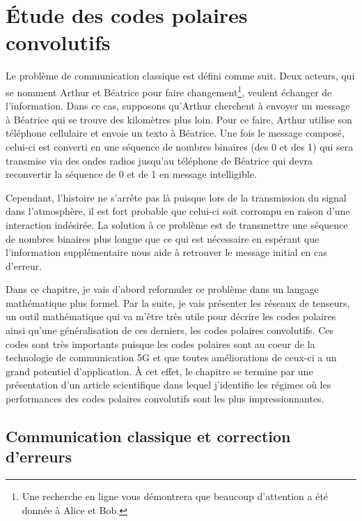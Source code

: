 \begin{comment}
\end{comment}

\chapter{Étude des codes polaires convolutifs}

Le problème de communication classique est défini comme suit.
Deux acteurs, 
qui se nomment Arthur et Béatrice pour faire changement\footnote{
  Une recherche en ligne vous démontrera que beaucoup d'attention a été donnée 
  à Alice et Bob. 
},
veulent échanger de l'information.
Dans ce cas,
supposons qu'Arthur cherchent à envoyer un message à Béatrice qui se trouve
des kilomètres plus loin.
Pour ce faire,
Arthur utilise son téléphone cellulaire et envoie un texto à Béatrice.
Une fois le message composé,
celui-ci est converti en une séquence de nombres binaires (des 0 et des 1)
qui sera transmise via des ondes radios jusqu'au téléphone de Béatrice
qui devra reconvertir la séquence de 0 et de 1 en message intelligible.

Cependant, 
l'histoire ne s'arrête pas là puisque lors de la transmission du signal
dans l'atmosphère, il est fort probable que celui-ci soit corrompu en 
raison d'une interaction indésirée.
La solution à ce problème est de transmettre une séquence de nombres binaires
plus longue que ce qui est nécessaire en espérant que l'information supplémentaire
  nous aide à retrouver le message initial en cas d'erreur.

Dans ce chapitre,
je vais d'abord reformuler ce problème dans un langage mathématique plus formel.  
Par la suite, 
je vais présenter les réseaux de tenseurs,
un outil mathématique qui va m'être très utile pour décrire les codes polaires 
ainsi qu'une généralisation de ces derniers, les codes polaires convolutifs.
Ces codes sont très importants puisque les codes polaires sont au coeur 
de la technologie de communication 5G et que toutes améliorations de ceux-ci
a un grand potentiel d'application.
À cet effet, le chapitre se termine par une présentation d'un article scientifique
dans lequel j'identifie les régimes où les performances des codes polaires convolutifs sont 
les plus impressionnantes.

\section{Communication classique et correction d'erreurs}

